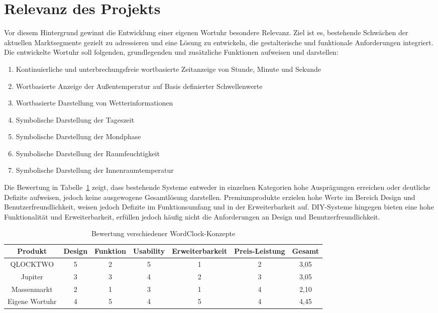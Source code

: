 \section{Relevanz des Projekts} 
Vor diesem Hintergrund gewinnt die Entwicklung einer eigenen Wortuhr besondere Relevanz. 
Ziel ist es, bestehende Schwächen der aktuellen Marktsegmente gezielt zu adressieren und eine Lösung zu entwickeln, die gestalterische und funktionale Anforderungen integriert. 
Die entwickelte Wortuhr soll folgenden, grundlegenden und zusätzliche Funktionen aufweisen und darstellen:

\begin{enumerate}
	\item Kontinuierliche und unterbrechungsfreie wortbasierte Zeitanzeige von Stunde, Minute und Sekunde
	\item Wortbasierte Anzeige der Außentemperatur auf Basis definierter Schwellenwerte
	\item Wortbasierte Darstellung von Wetterinformationen
	\item Symbolische Darstellung der Tageszeit
	\item Symbolische Darstellung der Mondphase
	\item Symbolische Darstellung der Raumfeuchtigkeit
	\item Symbolische Darstellung der Innenraumtemperatur
\end{enumerate}

Die Bewertung in Tabelle~\ref{tab:bewertung_wordclock} zeigt, dass bestehende Systeme entweder in einzelnen Kategorien hohe Ausprägungen erreichen oder deutliche Defizite aufweisen, jedoch keine ausgewogene Gesamtlösung darstellen. 
Premiumprodukte erzielen hohe Werte im Bereich Design und Benutzerfreundlichkeit, weisen jedoch Defizite im Funktionsumfang und in der Erweiterbarkeit auf. 
DIY-Systeme hingegen bieten eine hohe Funktionalität und Erweiterbarkeit, erfüllen jedoch häufig nicht die Anforderungen an Design und Benutzerfreundlichkeit. 

\begin{table}[h]
\centering
\begin{tabular}{|c|c|c|c|c|c|c|}
\hline
\textbf{Produkt} & \textbf{Design} & \textbf{Funktion} & \textbf{Usability} & \textbf{Erweiterbarkeit} & \textbf{Preis-Leistung} & \textbf{Gesamt} \\
\hline
QLOCKTWO & 5 & 2 & 5 & 1 & 2 & 3,05 \\
\hline
Jupiter & 3 & 3 & 4 & 2 & 3 & 3,05 \\
\hline
Massenmarkt & 2 & 1 & 3 & 1 & 4 & 2,10 \\
\hline
Eigene Wortuhr & 4 & 5 & 4 & 5 & 4 & 4,45 \\
\hline
\end{tabular}
\caption{Bewertung verschiedener WordClock-Konzepte}
\label{tab:bewertung_wordclock}
\end{table} 

